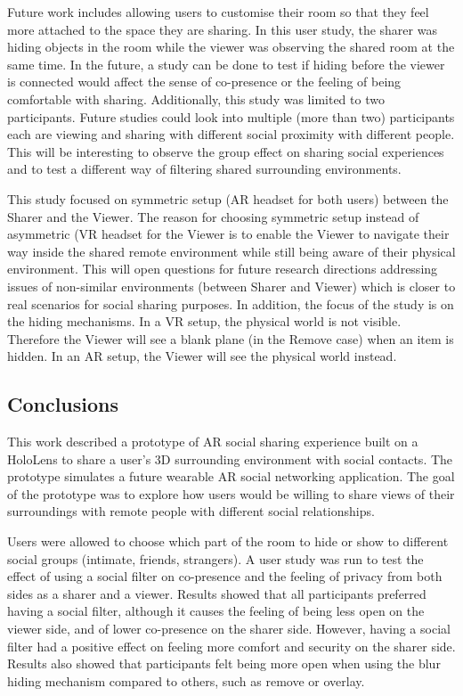 Future work includes allowing users to customise their room so that they feel more attached to the space they are sharing. In this user study, the sharer was hiding objects in the room while the viewer was observing the shared room at the same time. In the future, a study can be done to test if hiding before the viewer is connected would affect the sense of co-presence or the feeling of being comfortable with sharing. Additionally, this study was limited to two participants. Future studies could look into multiple (more than two) participants each are viewing and sharing with different social proximity with different people. This will be interesting to observe the group effect on sharing social experiences and to test a different way of filtering shared surrounding environments. 


This study focused on symmetric setup (AR headset for both users) between the Sharer and the Viewer. The reason for choosing symmetric setup instead of asymmetric (VR headset for the Viewer is to enable the Viewer to navigate their way inside the shared remote environment while still being aware of their physical environment. This will open questions for future research directions addressing issues of non-similar environments (between Sharer and Viewer) which is closer to real scenarios for social sharing purposes. In addition, the focus of the study is on the hiding mechanisms. In a VR setup, the physical world is not visible. Therefore the Viewer will see a blank  plane (in the Remove case) when an item is hidden. In an AR setup, the Viewer will see the physical world instead.  

\subsection{Conclusions}

This work described a prototype of AR social sharing experience built on a HoloLens to share a user's 3D surrounding environment with social contacts. The prototype simulates a future wearable AR social networking application. The goal of the prototype was to explore how users would be willing to share views of their surroundings with remote people with different social relationships. 

Users were allowed to choose which part of the room to hide or show to different social groups (intimate, friends, strangers). A user study was run to test the effect of using a social filter on co-presence and the feeling of privacy from both sides as a sharer and a viewer. Results showed that all participants preferred having a social filter, although it causes the feeling of being less open on the viewer side, and of lower co-presence on the sharer side. However, having a social filter had a positive effect on feeling more comfort and security on the sharer side. Results also showed that participants felt being more open when using the blur hiding mechanism compared to others, such as remove or overlay. 

